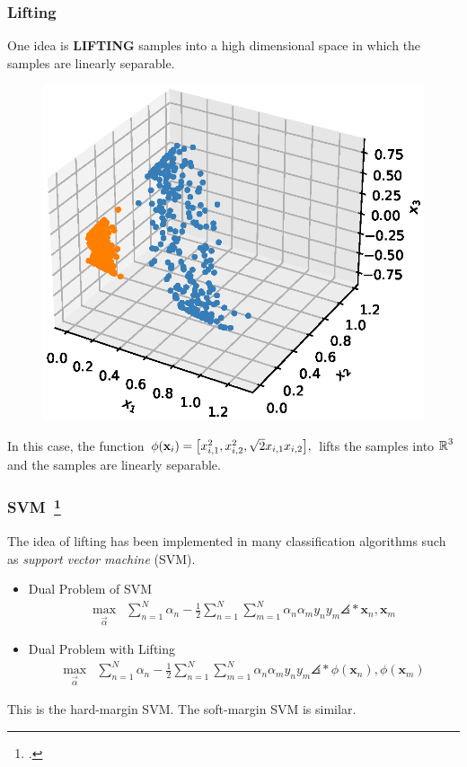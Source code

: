\documentclass[10pt]{../Formats/RU}
\begin{document}
\begin{frame}
  \frametitle{Lifting}
  One idea is \textbf{LIFTING} samples into a high dimensional space in which the samples are linearly separable.
  \begin{figure}
    \includegraphics[height=0.45\textheight]{./figs/3d_poly_circle.eps}%
  \end{figure}
  In this case, the function
  $
  \phi(\mathbf{x}_i) = \bracks*{x_{i,1}^2 , x_{i,2}^2 , \sqrt{2}x_{i,1}x_{i,2}},
  $
  lifts the samples into $\operatorname{\mathbb{R}}^3$ and the samples are linearly separable.
\end{frame}
\begin{frame}
  \frametitle{SVM~\footcite{boyd2004convex}}
  The idea of lifting has been implemented in many classification algorithms such as \emph{support vector machine} (SVM).
  \begin{itemize}
    \item Dual Problem of SVM{
      \begin{align*}
        \max_{\vec{\alpha}} &\sum_{n=1}^N\alpha_n - \frac{1}{2}\sum_{n=1}^{N}\sum_{m=1}^{N}\alpha_n\alpha_m y_ny_m\angles*{\mathbf{x}_n, \mathbf{x}_m}
      \end{align*}
    }
    \item Dual Problem with Lifting {
      \begin{align*}
        \max_{\vec{\alpha}} &\sum_{n=1}^N\alpha_n - \frac{1}{2}\sum_{n=1}^{N}\sum_{m=1}^{N}\alpha_n\alpha_m y_ny_m\angles*{\phi(\mathbf{x}_n), \phi(\mathbf{x}_m)}
      \end{align*}
    }
  \end{itemize}
  This is the hard-margin SVM. The soft-margin SVM is similar.
\end{frame}
\end{document}
